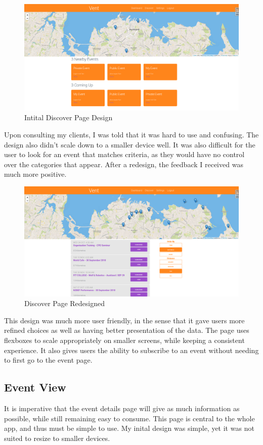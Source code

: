 \documentclass[a4paper,oneside,12pt]{report}
\begin{document}
	\begin{figure}[H]
		\caption{Intital Discover Page Design}
		\includegraphics[width=\linewidth]{static/front-end5.png}
	\end{figure}
	
	Upon consulting my clients, I was told that it was hard to use and confusing. The design also didn't scale down to a smaller device well. It was also difficult for the user to look for an event that matches criteria, as they would have no control over the categories that appear. After a redesign, the feedback I received was much more positive.

	\begin{figure}[H]
		\caption{Discover Page Redesigned}
		\includegraphics[width=\linewidth]{static/front-end4.png}
	\end{figure}
	
	This design was much more user friendly, in the sense that it gave users more refined choices as well as having better presentation of the data. The page uses flexboxes to scale appropriately on smaller screens, while keeping a consistent experience. It also gives users the ability to subscribe to an event without needing to first go to the event page.

	\subsection{Event View}
	It is imperative that the event details page will give as much information as possible, while still remaining easy to consume. This page is central to the whole app, and thus must be simple to use. My inital design was simple, yet it was not suited to resize to smaller devices.
	
\end{document}
